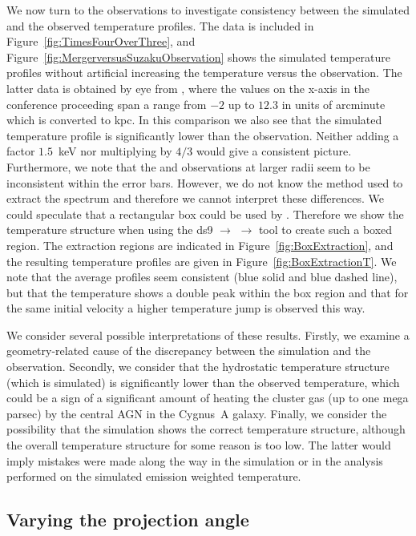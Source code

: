\documentclass[MScProj_TLRH_ClusterEnergy.tex]{subfiles}
\begin{document}
We now turn to the  observations to investigate consistency
between the simulated and the  observed temperature profiles.
The  data is included in Figure~\ref{fig:TimesFourOverThree}, and
Figure~\ref{fig:MergerversusSuzakuObservation} shows the simulated temperature 
profiles without artificial increasing the temperature versus the observation. The latter data is obtained by eye from \citet{2013AN....334..346S},
where the values on the x-axis in the conference proceeding span a range from
$-2$ up to $12.3$ in units of arcminute which is converted to kpc. In this 
comparison we also see that the simulated temperature profile is significantly
lower than the  observation. Neither adding a factor $1.5$~keV 
nor multiplying by $4/3$ would give a consistent picture. Furthermore, we note
that the  and  observations at larger radii 
seem to be inconsistent within the error bars. However, we do not know
the method used to extract the  spectrum and therefore we
cannot interpret these differences. We could speculate that a rectangular box 
could be used by \citet{2013AN....334..346S}. Therefore we show the temperature 
structure when using the ds9  $\rightarrow$  
$\rightarrow$  tool to create such a boxed region. The extraction
regions are indicated in Figure~\ref{fig:BoxExtraction}, and the resulting 
temperature profiles are given in Figure~\ref{fig:BoxExtractionT}. We note that
the average profiles seem consistent (blue solid and blue dashed line), but that
the temperature shows a double peak within the box region and that for the same
initial velocity a higher temperature jump is observed this way.


\newpage

We consider several possible interpretations of these results. Firstly, we examine
a geometry-related cause of the discrepancy between the simulation and the 
observation. Secondly, we consider that the hydrostatic temperature structure 
(which is simulated) is significantly lower than the observed temperature, 
which could be a sign of a significant amount of heating the cluster gas (up
to one mega parsec) by the central AGN in the Cygnus~A galaxy. Finally, we consider
the possibility that the simulation shows the correct temperature structure, 
although the overall temperature structure for some reason is too low. The latter 
would imply mistakes were made along the way in the simulation or in the analysis
performed on the simulated emission weighted temperature.




\subsection{Varying the projection angle}
\label{sec:ProjectionAngle}



\SubfileBibliography
\end{document}
